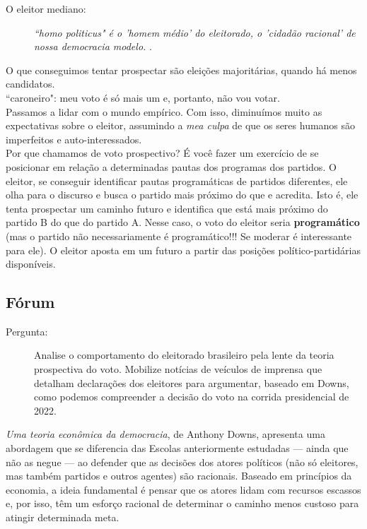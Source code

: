 \begin{description}
    \item [O eleitor mediano:] \textit{``homo politicus" é o 'homem médio' do eleitorado, o 'cidadão racional' de nossa democracia modelo.} \cite[~p. 29]{downs}. 
\end{description}

\noindent O que conseguimos tentar prospectar são eleições majoritárias, quando há menos candidatos. \\

\noindent ``caroneiro": meu voto é só mais um e, portanto, não vou votar. \\

\noindent Passamos a lidar com o mundo empírico. Com isso, diminuímos muito as expectativas sobre o eleitor, assumindo a \textit{mea culpa} de que os seres humanos são imperfeitos e auto-interessados. \\

\noindent Por que chamamos de voto prospectivo? É você fazer um exercício de se posicionar em relação a determinadas pautas dos programas dos partidos. O eleitor, se conseguir identificar pautas programáticas de partidos diferentes, ele olha para o discurso e busca o partido mais próximo do que e acredita. Isto é, ele tenta prospectar um caminho futuro e identifica que está mais próximo do partido B do que do partido A. Nesse caso, o voto do eleitor seria \textbf{programático} (mas o partido não necessariamente é programático!!! Se moderar é interessante para ele). O eleitor aposta em um futuro a partir das posições político-partidárias disponíveis.

\subsection{Fórum}

\begin{description}
    \item [Pergunta:] Analise o comportamento do eleitorado brasileiro pela lente da teoria prospectiva do voto. Mobilize notícias de veículos de imprensa que detalham declarações dos eleitores para argumentar, baseado em Downs, como podemos compreender a decisão do voto na corrida presidencial de 2022.
\end{description}

\textit{Uma teoria econômica da democracia}, de Anthony Downs, apresenta uma abordagem que se diferencia das Escolas anteriormente estudadas --- ainda que não as negue --- ao defender que as decisões dos atores políticos (não só eleitores, mas também partidos e outros agentes) são racionais. Baseado em princípios da economia, a ideia fundamental é pensar que os atores lidam com recursos escassos e, por isso, têm um esforço racional de determinar o caminho menos custoso para atingir determinada meta. 

